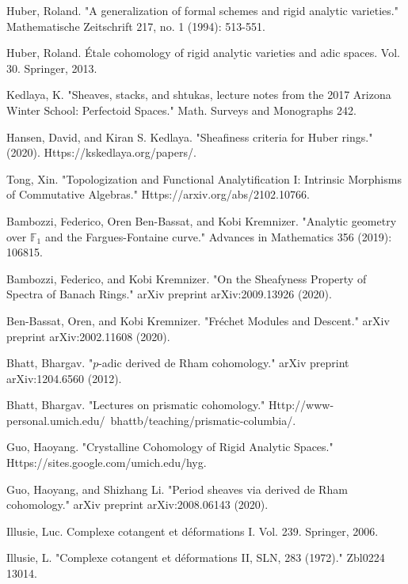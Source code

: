 \documentclass[11pt]{book}
\theoremstyle{definition}
\numberwithin{equation}{section}
\begin{document}
\begin{thebibliography}{10}

 Huber, Roland. "A generalization of formal schemes and rigid analytic varieties." Mathematische Zeitschrift 217, no. 1 (1994): 513-551.

 Huber, Roland. \'Etale cohomology of rigid analytic varieties and adic spaces. Vol. 30. Springer, 2013.

 Kedlaya, K. "Sheaves, stacks, and shtukas, lecture notes from the 2017 Arizona Winter School: Perfectoid Spaces." Math. Surveys and Monographs 242.

 Hansen, David, and Kiran S. Kedlaya. "Sheafiness criteria for Huber rings." (2020). Https://kskedlaya.org/papers/.

 Tong, Xin. "Topologization and Functional Analytification I: Intrinsic Morphisms of Commutative Algebras." Https://arxiv.org/abs/2102.10766.

 Bambozzi, Federico, Oren Ben-Bassat, and Kobi Kremnizer. "Analytic geometry over $\mathbb{F}_1$ and the Fargues-Fontaine curve." Advances in Mathematics 356 (2019): 106815.


 Bambozzi, Federico, and Kobi Kremnizer. "On the Sheafyness Property of Spectra of Banach Rings." arXiv preprint arXiv:2009.13926 (2020).


 Ben-Bassat, Oren, and Kobi Kremnizer. "Fr\'echet Modules and Descent." arXiv preprint arXiv:2002.11608 (2020).


 Bhatt, Bhargav. "$p$-adic derived de Rham cohomology." arXiv preprint arXiv:1204.6560 (2012).


 Bhatt, Bhargav. "Lectures on prismatic cohomology." Http://www-personal.umich.edu/~bhattb/teaching/prismatic-columbia/.


 Guo, Haoyang. "Crystalline Cohomology of Rigid Analytic Spaces." Https://sites.google.com/umich.edu/hyg.


 Guo, Haoyang, and Shizhang Li. "Period sheaves via derived de Rham cohomology." arXiv preprint arXiv:2008.06143 (2020).


 Illusie, Luc. Complexe cotangent et d\'eformations I. Vol. 239. Springer, 2006.

 Illusie, L. "Complexe cotangent et d\'eformations II, SLN, 283 (1972)." Zbl0224 13014.



\end{thebibliography}
\end{document}
